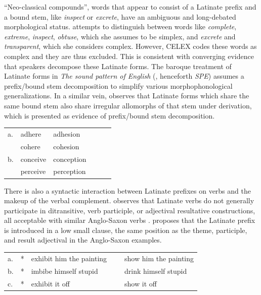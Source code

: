 ``Neo-classical compounds'', words that appear to consist of a Latinate prefix and a bound stem, like \emph{inspect} or \emph{excrete}, have an ambiguous and long-debated morphological status. \citeauthor{Pierrehumbert1994} attempts to distinguish between words like \emph{complete}, \emph{extreme}, \emph{inspect}, \emph{obtuse}, which she assumes to be simplex, and \emph{excrete} and \emph{transparent}, which she considers complex. However, CELEX codes these words as complex and they are thus excluded. This is consistent with converging evidence that speakers decompose these Latinate forms. The baroque treatment of Latinate forms in \emph{The sound pattern of English} (\citealp{SPE}, henceforth \emph{SPE}) assumes a prefix/bound stem decomposition to simplify various morphophonological generalizations.  In a similar vein, \citet[11--13]{Aronoff1976} observes that Latinate forms which share the same bound stem also share irregular allomorphs of that stem under derivation, which is presented as evidence of prefix/bound stem decomposition.

\begin{example}
\begin{tabular}{l l l l l l}
a. & {adhere}   & {adhesion}   \\
   & {cohere}   & {cohesion}   \\
b. & {conceive} & {conception} \\
   & {perceive} & {perception} \\
\end{tabular}
\end{example}

There is also a syntactic interaction between Latinate prefixes on verbs and the makeup of the verbal complement. \citet{Harley2009} observes that Latinate verbs do not generally participate in ditransitive, verb participle, or adjectival resultative constructions, all acceptable with similar Anglo-Saxon verbs \citep[see also][]{Gropen1989,Coppock2008}. \citeauthor{Harley2009} proposes that the Latinate prefix is introduced in a low small clause, the same position as the theme, participle, and result adjectival in the Anglo-Saxon examples.

\begin{example} 
\label{harley}
\begin{tabular}{ll@{}ll@{}l}
a. & * & {exhibit him the painting} & ~ & {show him the painting} \\
b. & * & {imbibe himself stupid}    & ~ & {drink himself stupid}  \\
c. & * & {exhibit it off}           & ~ & {show it off}           \\
\end{tabular}
\end{example}

